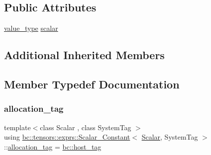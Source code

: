 \subsection*{Public Attributes}
\begin{DoxyCompactItemize}
\item 
\hyperlink{structbc_1_1Shape_3_010_01_4_a342cb50fc2de91d730a07750321bf986}{value\+\_\+type} \hyperlink{structbc_1_1tensors_1_1exprs_1_1Scalar__Constant_abd370a68cb7496699dc4805955658856}{scalar}
\end{DoxyCompactItemize}
\subsection*{Additional Inherited Members}


\subsection{Member Typedef Documentation}
\mbox{\label{structbc_1_1tensors_1_1exprs_1_1Scalar__Constant_ade9d036a5efd1c6d90c2eb03841892e1}} 
\subsubsection{\texorpdfstring{allocation\+\_\+tag}{allocation\_tag}}
{\footnotesize\ttfamily template$<$class Scalar , class System\+Tag $>$ \\
using \hyperlink{structbc_1_1tensors_1_1exprs_1_1Scalar__Constant}{bc\+::tensors\+::exprs\+::\+Scalar\+\_\+\+Constant}$<$ \hyperlink{namespacebc_aa12ac55ee2c43dc082894dd3859daee1}{Scalar}, System\+Tag $>$\+::\hyperlink{structbc_1_1tensors_1_1exprs_1_1Scalar__Constant_ade9d036a5efd1c6d90c2eb03841892e1}{allocation\+\_\+tag} =  \hyperlink{structbc_1_1host__tag}{bc\+::host\+\_\+tag}}

\mbox{\label{structbc_1_1tensors_1_1exprs_1_1Scalar__Constant_a9e3e003a807bb461f0120f993e2d36e5}} 
